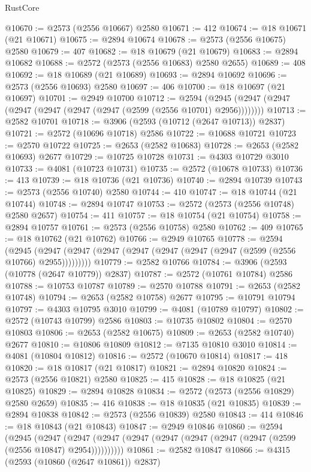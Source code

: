 \begin{lexlean}{RustCore}
\begin{coremodule}
@10670 := @2573 (@2556 @10667) @2580
@10671 := 412
@10674 := @18 @10671 (@21 @10671)
@10675 := @2894 @10674
@10678 := @2573 (@2556 @10675) @2580
@10679 := 407
@10682 := @18 @10679 (@21 @10679)
@10683 := @2894 @10682
@10688 := @2572 (@2573 (@2556 @10683) @2580 @2655)
@10689 := 408
@10692 := @18 @10689 (@21 @10689)
@10693 := @2894 @10692
@10696 := @2573 (@2556 @10693) @2580
@10697 := 406
@10700 := @18 @10697 (@21 @10697)
@10701 := @2949 @10700
@10712 := @2594 (@2945 (@2947 (@2947 (@2947 (@2947 (@2947 (@2947 (@2599 (@2556 @10701) @2956))))))))
@10713 := @2582 @10701
@10718 := @3906 (@2593 (@10712 (@2647 @10713)) @2837)
@10721 := @2572 (@10696 @10718) @2586
@10722 := @10688 @10721
@10723 := @2570 @10722
@10725 := @2653 (@2582 @10683)
@10728 := @2653 (@2582 @10693) @2677
@10729 := @10725 @10728
@10731 := @4303 @10729 @3010
@10733 := @4081 (@10723 @10731)
@10735 := @2572 (@10678 @10733)
@10736 := 413
@10739 := @18 @10736 (@21 @10736)
@10740 := @2894 @10739
@10743 := @2573 (@2556 @10740) @2580
@10744 := 410
@10747 := @18 @10744 (@21 @10744)
@10748 := @2894 @10747
@10753 := @2572 (@2573 (@2556 @10748) @2580 @2657)
@10754 := 411
@10757 := @18 @10754 (@21 @10754)
@10758 := @2894 @10757
@10761 := @2573 (@2556 @10758) @2580
@10762 := 409
@10765 := @18 @10762 (@21 @10762)
@10766 := @2949 @10765
@10778 := @2594
    (@2945 (@2947 (@2947 (@2947 (@2947 (@2947 (@2947 (@2947 (@2599 (@2556 @10766) @2955)))))))))
@10779 := @2582 @10766
@10784 := @3906 (@2593 (@10778 (@2647 @10779)) @2837)
@10787 := @2572 (@10761 @10784) @2586
@10788 := @10753 @10787
@10789 := @2570 @10788
@10791 := @2653 (@2582 @10748)
@10794 := @2653 (@2582 @10758) @2677
@10795 := @10791 @10794
@10797 := @4303 @10795 @3010
@10799 := @4081 (@10789 @10797)
@10802 := @2572 (@10743 @10799) @2586
@10803 := @10735 @10802
@10804 := @2570 @10803
@10806 := @2653 (@2582 @10675)
@10809 := @2653 (@2582 @10740) @2677
@10810 := @10806 @10809
@10812 := @7135 @10810 @3010
@10814 := @4081 (@10804 @10812)
@10816 := @2572 (@10670 @10814)
@10817 := 418
@10820 := @18 @10817 (@21 @10817)
@10821 := @2894 @10820
@10824 := @2573 (@2556 @10821) @2580
@10825 := 415
@10828 := @18 @10825 (@21 @10825)
@10829 := @2894 @10828
@10834 := @2572 (@2573 (@2556 @10829) @2580 @2659)
@10835 := 416
@10838 := @18 @10835 (@21 @10835)
@10839 := @2894 @10838
@10842 := @2573 (@2556 @10839) @2580
@10843 := 414
@10846 := @18 @10843 (@21 @10843)
@10847 := @2949 @10846
@10860 := @2594
    (@2945
      (@2947 (@2947 (@2947 (@2947 (@2947 (@2947 (@2947 (@2947 (@2599 (@2556 @10847) @2954))))))))))
@10861 := @2582 @10847
@10866 := @4315 (@2593 (@10860 (@2647 @10861)) @2837)

\end{coremodule}
\end{lexlean}
